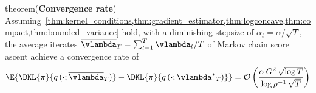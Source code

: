 \begin{theoremEnd}{theorem}{(\textbf{Convergence rate})}\label{thm:convergence_rate}
  Assuming~\cref{thm:kernel_conditions,thm:gradient_estimator,thm:logconcave,thm:compact,thm:bounded_variance} hold, with a diminishing stepsize of \(\alpha_t = \alpha /  \sqrt{T} \), the average iterates {\small\(\overline{\vlambda}_T = \sum^{T}_{t=1} \vlambda_{t} / T\)} of Markov chain score ascent achieve a convergence rate of
  {%
  \begin{align*}
    \E{ \DKL{\pi}{q\,(\cdot; {\overline{\vlambda}_{T}})} - \DKL{\pi}{q\left(\cdot; {\vlambda^*}_{T}\right)}}
    =
    \mathcal{O}\left(
    \frac{
      \alpha \, G^2 \, \sqrt{\log T}
    }{
      \log \rho^{-1} \, \sqrt{T}
    } \right)  
  \end{align*}
  }
\end{theoremEnd}
